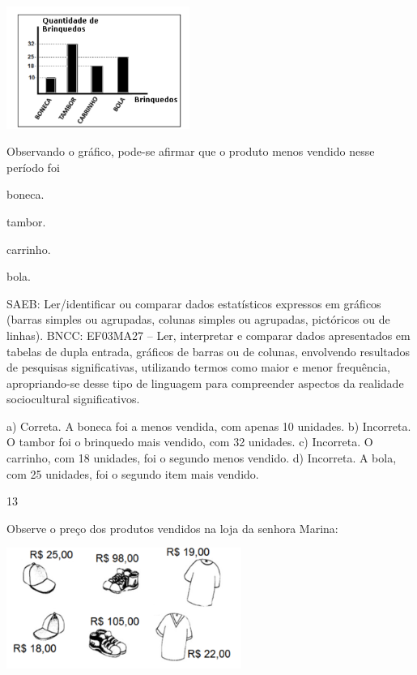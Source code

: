 \begin{multicols}{2}
{\begin{escolha}
{%

\includegraphics[width=2.35294in,height=1.56863in]{media/image137.png}

Observando o gráfico, pode-se afirmar que o produto menos vendido nesse período foi

\begin{escolha}

\item
  boneca.
\item
  tambor.
\item
  carrinho.
\item
  bola.
\end{escolha}

SAEB: Ler/identificar ou comparar dados estatísticos
expressos em gráficos (barras simples ou agrupadas, colunas simples ou agrupadas, pictóricos ou de linhas).
BNCC: EF03MA27 -- Ler, interpretar e comparar dados apresentados em tabelas de dupla entrada,
gráficos de barras ou de colunas, envolvendo resultados de pesquisas significativas, utilizando
termos como maior e menor frequência, apropriando-se desse tipo de linguagem para
compreender aspectos da realidade sociocultural significativos.

a) Correta. A boneca foi a menos vendida, com apenas 10 unidades.
b) Incorreta. O tambor foi o brinquedo mais vendido, com 32 unidades.
c) Incorreta. O carrinho, com 18 unidades, foi o segundo menos vendido.
d) Incorreta. A bola, com 25 unidades, foi o segundo item mais vendido.

\num{13}

Observe o preço dos produtos vendidos na loja da senhora Marina:


\includegraphics[width=3.02451in,height=1.54853in]{media/image138.png}

}
\end{escolha}}
\end{multicols}
